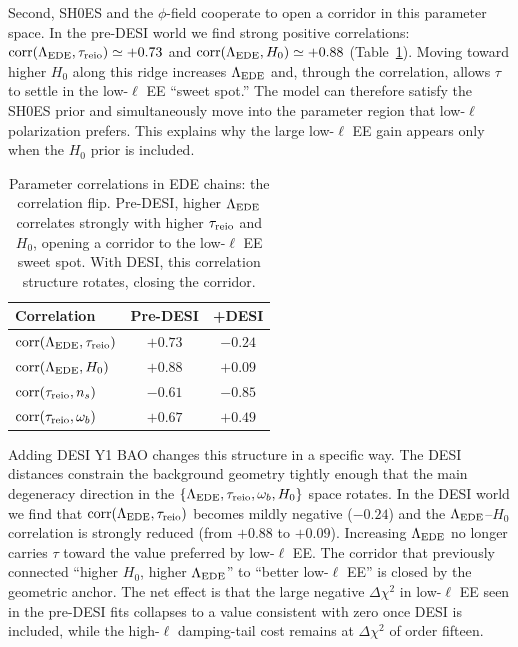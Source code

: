 \documentclass[a4paper,11pt]{article}
\begin{document}
Second, SH0ES and the $\phi$-field cooperate to open a corridor in this parameter space. In the pre-DESI world we find strong positive correlations: $\mathrm{corr}(\Lambda_{\rm EDE}, \tau_{\rm reio}) \simeq +0.73$ and $\mathrm{corr}(\Lambda_{\rm EDE}, H_0) \simeq +0.88$ (Table~\ref{tab:correlation_flip}). Moving toward higher $H_0$ along this ridge increases $\Lambda_{\rm EDE}$ and, through the correlation, allows $\tau$ to settle in the low-$\ell$ EE ``sweet spot.'' The model can therefore satisfy the SH0ES prior and simultaneously move into the parameter region that low-$\ell$ polarization prefers. This explains why the large low-$\ell$ EE gain appears only when the $H_0$ prior is included.

\begin{table}[ht]
\centering
\caption{Parameter correlations in EDE chains: the correlation flip. Pre-DESI, higher $\Lambda_{\rm EDE}$ correlates strongly with higher $\tau_{\rm reio}$ and $H_0$, opening a corridor to the low-$\ell$ EE sweet spot. With DESI, this correlation structure rotates, closing the corridor.}
\label{tab:correlation_flip}
\begin{tabular}{lcc}
\toprule
\textbf{Correlation} & \textbf{Pre-DESI} & \textbf{+DESI} \\
\midrule
$\mathrm{corr}(\Lambda_{\rm EDE}, \tau_{\rm reio})$ & $\mathbf{+0.73}$ & $\mathbf{-0.24}$ \\
$\mathrm{corr}(\Lambda_{\rm EDE}, H_0)$ & $+0.88$ & $+0.09$ \\
$\mathrm{corr}(\tau_{\rm reio}, n_s)$ & $-0.61$ & $-0.85$ \\
$\mathrm{corr}(\tau_{\rm reio}, \omega_b)$ & $+0.67$ & $+0.49$ \\
\bottomrule
\end{tabular}
\end{table}

Adding DESI Y1 BAO changes this structure in a specific way. The DESI distances constrain the background geometry tightly enough that the main degeneracy direction in the $\{\Lambda_{\rm EDE}, \tau_{\rm reio}, \omega_b, H_0\}$ space rotates. In the DESI world we find that $\mathrm{corr}(\Lambda_{\rm EDE}, \tau_{\rm reio})$ becomes mildly negative ($-0.24$) and the $\Lambda_{\rm EDE}$--$H_0$ correlation is strongly reduced (from $+0.88$ to $+0.09$). Increasing $\Lambda_{\rm EDE}$ no longer carries $\tau$ toward the value preferred by low-$\ell$ EE. The corridor that previously connected ``higher $H_0$, higher $\Lambda_{\rm EDE}$'' to ``better low-$\ell$ EE'' is closed by the geometric anchor. The net effect is that the large negative $\Delta\chi^2$ in low-$\ell$ EE seen in the pre-DESI fits collapses to a value consistent with zero once DESI is included, while the high-$\ell$ damping-tail cost remains at $\Delta\chi^2$ of order fifteen.
\end{document}
